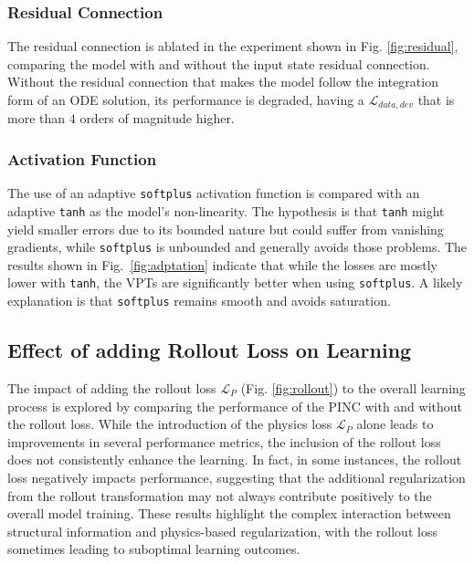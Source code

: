 \subsubsection{Residual Connection}
The residual connection is ablated in the experiment shown in Fig. \ref{fig:residual}, comparing the model with and without the input state residual connection. Without the residual connection that makes the model follow the integration form of an ODE solution, its performance is degraded, having a $\mathcal{L}_{data,dev}$ that is more than $4$ orders of magnitude higher. 
%


%
\subsubsection{Activation Function}
The use of an adaptive \lstinline|softplus| activation function is compared with an adaptive \lstinline|tanh| as the model's non-linearity. The hypothesis is that \lstinline|tanh| might yield smaller errors due to its bounded nature but could suffer from vanishing gradients, while \lstinline|softplus| is unbounded and generally avoids those problems.
%
The results shown in Fig.~\ref{fig:adptation} indicate that while the losses are mostly lower with \lstinline|tanh|, the VPTs are significantly better when using \lstinline|softplus|. A likely explanation is that \lstinline|softplus| remains smooth and avoids saturation. 



\subsection{Effect of adding Rollout Loss on Learning}
The impact of adding the rollout loss $\mathcal{L}_P$ (Fig. \ref{fig:rollout}) to the overall learning process is explored by comparing the performance of the PINC with and without the rollout loss. While the introduction of the physics loss $\mathcal{L}_P$ alone leads to improvements in several performance metrics, the inclusion of the rollout loss does not consistently enhance the learning. In fact, in some instances, the rollout loss negatively impacts performance, suggesting that the additional regularization from the rollout transformation may not always contribute positively to the overall model training. These results highlight the complex interaction between structural information and physics-based regularization, with the rollout loss sometimes leading to suboptimal learning outcomes.


